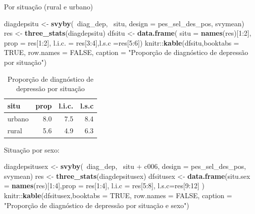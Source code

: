 \documentclass[]{book}
\newenvironment{Shaded}{\begin{snugshade}}{\end{snugshade}}
\newcommand{\KeywordTok}[1]{\textcolor[rgb]{0.13,0.29,0.53}{\textbf{{#1}}}}
\newcommand{\DataTypeTok}[1]{\textcolor[rgb]{0.13,0.29,0.53}{{#1}}}
\newcommand{\DecValTok}[1]{\textcolor[rgb]{0.00,0.00,0.81}{{#1}}}
\newcommand{\StringTok}[1]{\textcolor[rgb]{0.31,0.60,0.02}{{#1}}}
\newcommand{\OtherTok}[1]{\textcolor[rgb]{0.56,0.35,0.01}{{#1}}}
\newcommand{\NormalTok}[1]{{#1}}
\numberwithin{example}{chapter}
\numberwithin{remark}{chapter}
\numberwithin{definition}{chapter}
\begin{document}
Por situação (rural e urbano)

\begin{Shaded}
\begin{Highlighting}[]
\NormalTok{diagdepsitu <-}\StringTok{ }\KeywordTok{svyby}\NormalTok{(~diag_dep, ~situ, }\DataTypeTok{design =} \NormalTok{pes_sel_des_pos, }
  \NormalTok{svymean)}
\NormalTok{res <-}\StringTok{ }\KeywordTok{three_stats}\NormalTok{(diagdepsitu)}
\NormalTok{dfsitu <-}\StringTok{ }\KeywordTok{data.frame}\NormalTok{( }\DataTypeTok{situ =} \KeywordTok{names}\NormalTok{(res)[}\DecValTok{1}\NormalTok{:}\DecValTok{2}\NormalTok{], }\DataTypeTok{prop =} \NormalTok{res[}\DecValTok{1}\NormalTok{:}\DecValTok{2}\NormalTok{], }\DataTypeTok{l.i.c. =} \NormalTok{res[}\DecValTok{3}\NormalTok{:}\DecValTok{4}\NormalTok{],}\DataTypeTok{l.s.c =}\NormalTok{res[}\DecValTok{5}\NormalTok{:}\DecValTok{6}\NormalTok{])}
\NormalTok{knitr::}\KeywordTok{kable}\NormalTok{(dfsitu,}\DataTypeTok{booktabs =} \OtherTok{TRUE}\NormalTok{, }\DataTypeTok{row.names =} \OtherTok{FALSE}\NormalTok{, }
\DataTypeTok{caption =} \StringTok{"Proporção de diagnóstico de depressão por situação"}\NormalTok{)}
\end{Highlighting}
\end{Shaded}

\begin{table}

\caption{\label{tab:unnamed-chunk-43}Proporção de diagnóstico de depressão por situação}
\centering
\begin{tabular}[t]{lrrr}
\toprule
situ & prop & l.i.c. & l.s.c\\
\midrule
urbano & 8.0 & 7.5 & 8.4\\
rural & 5.6 & 4.9 & 6.3\\
\bottomrule
\end{tabular}
\end{table}

Situação por sexo:

\begin{Shaded}
\begin{Highlighting}[]
\NormalTok{diagdepsitusex <-}\StringTok{ }\KeywordTok{svyby}\NormalTok{(~diag_dep, ~situ +}\StringTok{ }\NormalTok{c006, }\DataTypeTok{design =} \NormalTok{pes_sel_des_pos, }
  \NormalTok{svymean)}
\NormalTok{res <-}\StringTok{ }\KeywordTok{three_stats}\NormalTok{(diagdepsitusex)}
\NormalTok{dfsitusex <-}\StringTok{ }\KeywordTok{data.frame}\NormalTok{(}\DataTypeTok{situ.sex =} \KeywordTok{names}\NormalTok{(res)[}\DecValTok{1}\NormalTok{:}\DecValTok{4}\NormalTok{],}\DataTypeTok{prop =} \NormalTok{res[}\DecValTok{1}\NormalTok{:}\DecValTok{4}\NormalTok{], }
  \DataTypeTok{l.i.c =} \NormalTok{res[}\DecValTok{5}\NormalTok{:}\DecValTok{8}\NormalTok{], }\DataTypeTok{l.s.c=}\NormalTok{res[}\DecValTok{9}\NormalTok{:}\DecValTok{12}\NormalTok{] )}
\NormalTok{knitr::}\KeywordTok{kable}\NormalTok{(dfsitusex,}\DataTypeTok{booktabs =} \OtherTok{TRUE}\NormalTok{, }\DataTypeTok{row.names =} \OtherTok{FALSE}\NormalTok{,}
\DataTypeTok{caption =} \StringTok{"Proporção de diagnóstico de depressão por situação e sexo"}\NormalTok{)}
\end{Highlighting}
\end{Shaded}
\end{document}
